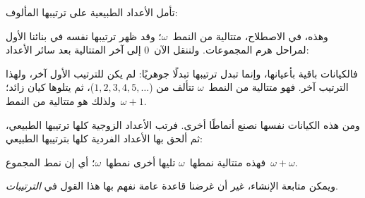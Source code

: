 \documentclass[../../../include/open-logic-section]{subfiles}
\begin{document}

تأمل الأعداد الطبيعية على ترتيبها المألوف:
\begin{center}
\end{center}
وهذه، في الاصطلاح، متتالية من النمط~$\omega$؛ وقد ظهر ترتيبها نفسه في
بنائنا الأول لمراحل هرم المجموعات. ولننقل الآن~$0$ إلى آخر المتتالية
بعد سائر الأعداد:
\begin{center}
\end{center}
فالكيانات باقية بأعيانها، وإنما تبدل ترتيبها تبدلًا جوهريًا: لم يكن
للترتيب الأول آخر، ولهذا الترتيب آخر. فهو متتالية من النمط~$\omega$
تتألف من ($1, 2, 3, 4, 5, \ldots$)، ثم يتلوها كيان زائد؛ ولذلك هو
متتالية من النمط~$\omega+1$.

ومن هذه الكيانات نفسها نصنع أنماطًا أخرى. فرتب الأعداد الزوجية كلها
ترتيبها الطبيعي، ثم ألحق بها الأعداد الفردية كلها بترتيبها الطبيعي:
\begin{center}
\end{center}
فهذه متتالية نمطها~$\omega$ تليها أخرى نمطها~$\omega$؛ أي إن نمط
المجموع~$\omega+\omega$.

ويمكن متابعة الإنشاء، غير أن غرضنا قاعدة عامة نفهم بها هذا القول في
\emph{الترتيبات}.
\end{document}
